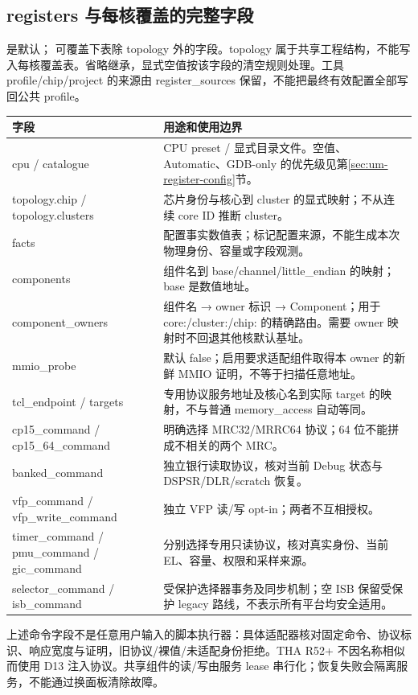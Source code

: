 \documentclass[UTF8,a4paper,11pt,oneside,fontset=none]{ctexart}
\newcommand{\code}[1]{\texttt{\detokenize{#1}}}
\begin{document}
\subsection{registers 与每核覆盖的完整字段}
\label{sec:register-schema-complete}
\code{[registers]} 是默认；\code{[cores.registers]} 可覆盖下表除 topology 外的字段。topology 属于共享工程结构，不能写入每核覆盖表。省略继承，显式空值按该字段的清空规则处理。工具 profile/chip/project 的来源由 register\_sources 保留，不能把最终有效配置全部写回公共 profile。
\begin{longtable}{@{}P{51mm}P{110mm}@{}}\toprule
字段 & 用途和使用边界\\\midrule\endhead
cpu / catalogue & CPU preset / 显式目录文件。空值、Automatic、GDB-only 的优先级见第\ref{sec:um-register-config}节。\\
topology.chip / topology.clusters & 芯片身份与核心到 cluster 的显式映射；不从连续 core ID 推断 cluster。\\
facts & 配置事实数值表；标记配置来源，不能生成本次物理身份、容量或字段观测。\\
components & 组件名到 base/channel/little\_endian 的映射；base 是数值地址。\\
component\_owners & 组件名 → owner 标识 → Component；用于 core:/cluster:/chip: 的精确路由。需要 owner 映射时不回退其他核默认基址。\\
mmio\_probe & 默认 false；启用要求适配组件取得本 owner 的新鲜 MMIO 证明，不等于扫描任意地址。\\
tcl\_endpoint / targets & 专用协议服务地址及核心名到实际 target 的映射，不与普通 memory\_access 自动等同。\\
cp15\_command / cp15\_64\_command & 明确选择 MRC32/MRRC64 协议；64 位不能拼成不相关的两个 MRC。\\
banked\_command & 独立银行读取协议，核对当前 Debug 状态与 DSPSR/DLR/scratch 恢复。\\
vfp\_command / vfp\_write\_command & 独立 VFP 读/写 opt-in；两者不互相授权。\\
timer\_command / pmu\_command / gic\_command & 分别选择专用只读协议，核对真实身份、当前 EL、容量、权限和采样来源。\\
selector\_command / isb\_command & 受保护选择器事务及同步机制；空 ISB 保留受保护 legacy 路线，不表示所有平台均安全适用。\\\bottomrule
\end{longtable}
上述命令字段不是任意用户输入的脚本执行器：具体适配器核对固定命令、协议标识、响应宽度与证明，旧协议/裸值/未适配身份拒绝。THA R52+ 不因名称相似而使用 D13 注入协议。共享组件的读/写由服务 lease 串行化；恢复失败会隔离服务，不能通过换面板清除故障。
\end{document}
